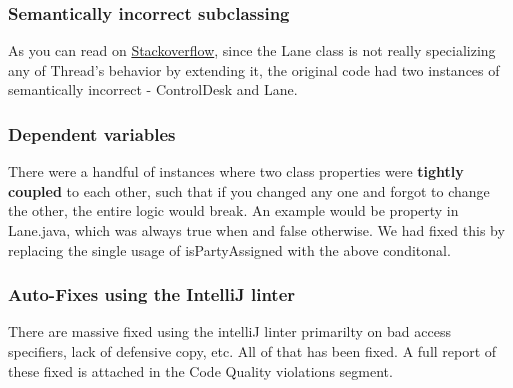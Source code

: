 \subsubsection{Semantically incorrect subclassing}

As you can read on \hyperlink{https://stackoverflow.com/questions/541487/implements-runnable-vs-extends-thread-in-java}{Stackoverflow}, since the Lane class is not really specializing any of Thread's behavior by extending it, the original code had two instances of semantically incorrect  - ControlDesk and Lane.

\subsubsection{Dependent variables}

There were a handful of instances where two class properties were \textbf{tightly coupled} to each other, such that if you changed any one and forgot to change the other, the entire logic would break. An example would be  property in Lane.java, which was always true when  and false otherwise. We had fixed this by replacing the single usage of isPartyAssigned with the above conditonal.

\subsubsection{Auto-Fixes using the IntelliJ linter}

There are massive fixed using the intelliJ linter primarilty on bad access specifiers, lack of defensive copy, etc. All of that has been fixed. A full report of these fixed is attached in the Code Quality violations segment.